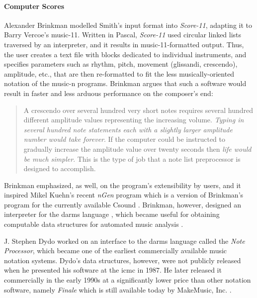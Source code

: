 	\paragraph{Computer Scores}
	\label{computer:computer}

	Alexander Brinkman \parencite{icmc/bbp2372.1981.018} modelled Smith's input format into \textit{Score-11}, adapting it to Barry Vercoe's \gls{music-11}. Written in Pascal, \textit{Score-11} used circular linked lists traversed by an interpreter, and it results in \gls{music-11}-formatted output. Thus, the user creates a text file with blocks dedicated to individual instruments, and specifies parameters such as rhythm, pitch, movement (glissandi, crescendo), amplitude, etc., that are then re-formatted to fit the less musically-oriented notation of the \gls{music-n} programs. Brinkman argues that such a software would result in faster and less arduous performance on the composer's end:

	\begin{quote}
		A crescendo over several hundred very short notes requires several hundred different amplitude values representing the increasing volume. \textit{Typing in several hundred note statements each with a slightly larger amplitude number would take forever}. If the computer could be instructed to gradually increase the amplitude value over twenty seconds then \textit{life would be much simpler}. This is the type of job that a note list preprocessor is designed to accomplish. \im \parencite{score11manual}
	\end{quote}

	Brinkman emphasized, as well, on the program's extensibility by users, and it inspired Mikel Kuehn's recent \textit{nGen} program which is a version of Brinkman's program for the currently available Csound \parencite{csoundMethods}. Brinkman, however, designed an interpreter for the \gls{darms} language \parencite{icmc/bbp2372.1983.002}, which became useful for obtaining computable data structures for automated music analysis \parencite{icmc/bbp2372.1984.033}. 

	J. Stephen Dydo \parencite{icmc/bbp2372.1987.045} worked on an interface to the \gls{darms} language called the \textit{Note Processor}, which became one of the earliest commercially available music notation systems. Dydo's data structures, however, were not publicly released when he presented his software at the \gls{icmc} in 1987. He later released it commercially in the early 1990s at a significantly lower price than other notation software, namely \textit{Finale} which is still available today by MakeMusic, Inc. \parencite{10.2307/941442,10.2307/940555}.

